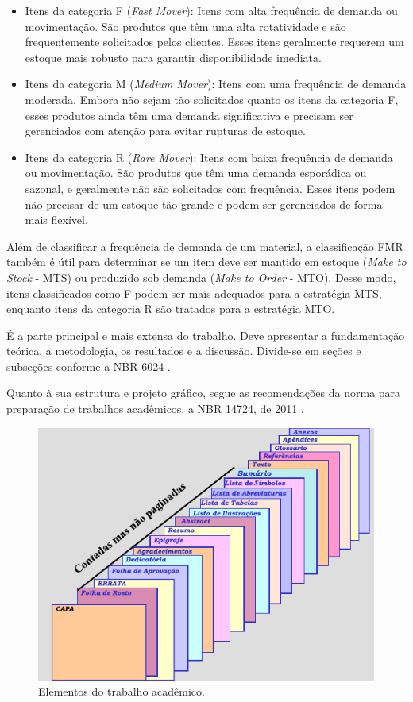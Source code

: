\begin{itemize}
	\item Itens da categoria F (\textit{Fast Mover}): Itens com alta frequência de demanda ou movimentação. São produtos que têm uma alta rotatividade e são frequentemente solicitados pelos clientes. Esses itens geralmente requerem um estoque mais robusto para garantir disponibilidade imediata.
	\item Itens da categoria  M (\textit{Medium Mover}): Itens com uma frequência de demanda moderada. Embora não sejam tão solicitados quanto os itens da categoria F, esses produtos ainda têm uma demanda significativa e precisam ser gerenciados com atenção para evitar rupturas de estoque.
	\item Itens da categoria R (\textit{Rare Mover}): Itens com baixa frequência de demanda ou movimentação. São produtos que têm uma demanda esporádica ou sazonal, e geralmente não são solicitados com frequência. Esses itens podem não precisar de um estoque tão grande e podem ser gerenciados de forma mais flexível.
\end{itemize}

Além de classificar a frequência de demanda de um material, a classificação FMR também é útil para determinar se um item deve ser mantido em estoque (\textit{Make to Stock} - MTS) ou produzido sob demanda (\textit{Make to Order} - MTO). Desse modo, itens classificados como F podem ser mais adequados para a estratégia MTS, enquanto itens da categoria R são tratados para a estratégia MTO.

É a parte principal e mais extensa do trabalho. Deve apresentar a fundamentação teórica, a metodologia, os resultados e a discussão. Divide-se em seções e subseções conforme a NBR 6024 \cite{NBR6024:2012}.

Quanto à sua estrutura e projeto gráfico, segue as recomendações da norma para preparação de trabalhos acadêmicos, a NBR 14724, de 2011 \cite{NBR14724:2011}.

\begin{figure}[htb]
	\caption{\label{fig:Fig_2}Elementos do trabalho acadêmico.}
	\begin{center}
		\includegraphics{figuras/imagem.pdf}
	\end{center}
\end{figure}


